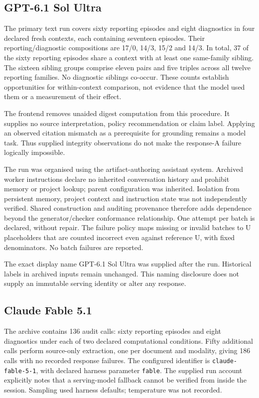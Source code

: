 \subsection{GPT-6.1 Sol Ultra}
The primary text run covers sixty reporting episodes and eight diagnostics in four declared fresh contexts, each containing seventeen episodes. Their reporting/diagnostic compositions are 17/0, 14/3, 15/2 and 14/3. In total, 37 of the sixty reporting episodes share a context with at least one same-family sibling. The sixteen sibling groups comprise eleven pairs and five triples across all twelve reporting families. No diagnostic siblings co-occur. These counts establish opportunities for within-context comparison, not evidence that the model used them or a measurement of their effect.

The frontend removes unaided digest computation from this procedure. It supplies no source interpretation, policy recommendation or claim label. Applying an observed citation mismatch as a prerequisite for grounding remains a model task. Thus supplied integrity observations do not make the response-A failure logically impossible.

The run was organised using the artifact-authoring assistant system. Archived worker instructions declare no inherited conversation history and prohibit memory or project lookup; parent configuration was inherited. Isolation from persistent memory, project context and instruction state was not independently verified. Shared construction and auditing provenance therefore adds dependence beyond the generator/checker conformance relationship. One attempt per batch is declared, without repair. The failure policy maps missing or invalid batches to U placeholders that are counted incorrect even against reference U, with fixed denominators. No batch failures are reported.

The exact display name GPT-6.1 Sol Ultra was supplied after the run. Historical labels in archived inputs remain unchanged. This naming disclosure does not supply an immutable serving identity or alter any response.

\subsection{Claude Fable 5.1}
The archive contains 136 audit calls: sixty reporting episodes and eight diagnostics under each of two declared computational conditions. Fifty additional calls perform source-only extraction, one per document and modality, giving 186 calls with no recorded response failures. The configured identifier is \texttt{claude-fable-5-1}, with declared harness parameter \texttt{fable}. The supplied run account explicitly notes that a serving-model fallback cannot be verified from inside the session. Sampling used harness defaults; temperature was not recorded.

